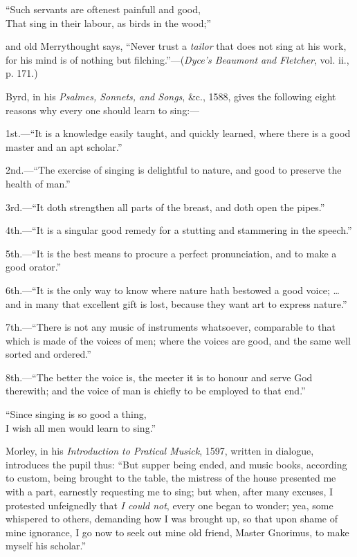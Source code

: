 \begin{scverse}
“Such servants are oftenest painfull and good,\\
That sing in their labour, as birds in the wood;”
\end{scverse}
and old Merrythought says, “Never trust a \textit{tailor} that does not sing at
his work, for his mind is of nothing but filching.”—(\textit{Dyce’s Beaumont and
Fletcher}, vol. ii., p. 171.)


Byrd, in his \textit{Psalmes, Sonnets, and Songs}, \&c., 1588, gives the following eight
reasons why every one should learn to sing:—

1st.—“It is a knowledge easily taught, and quickly learned, where there is a good
master and an apt scholar.”

2nd.—“The exercise of singing is delightful to nature, and good to preserve the
health of man.”

3rd.—“It doth strengthen all parts of the breast, and doth open the pipes.”

4th.—“It is a singular good remedy for a stutting and stammering in the speech.”

5th.—“It is the best means to procure a perfect pronunciation, and to make a good
orator.”

6th.—“It is the only way to know where nature hath bestowed a good voice; \ldots
and in many that excellent gift is lost, because they want art to express nature.”

7th.—“There is not any music of instruments whatsoever, comparable to that which
is made of the voices of men; where the voices are good, and the same well sorted
and ordered.”

8th.—“The better the voice is, the meeter it is to honour and serve God therewith;
and the voice of man is chiefly to be employed to that end.”

\begin{scverse}
“Since singing is so good a thing,\\
I wish all men would learn to sing.”
\end{scverse}

Morley, in his \textit{Introduction to Pratical Musick}, 1597, written in dialogue,
introduces the pupil thus: “But supper being ended, and music books,
according to custom, being brought to the table, the mistress of the house presented
me with a part, earnestly requesting me to sing; but when, after many
excuses, I protested unfeignedly that \pagebreak \textit{I could not}, every one began to wonder; yea,
some whispered to others, demanding how I was brought up, so that upon shame
of mine ignorance, I go now to seek out mine old friend, Master Gnorimus, to
make myself his scholar.”

